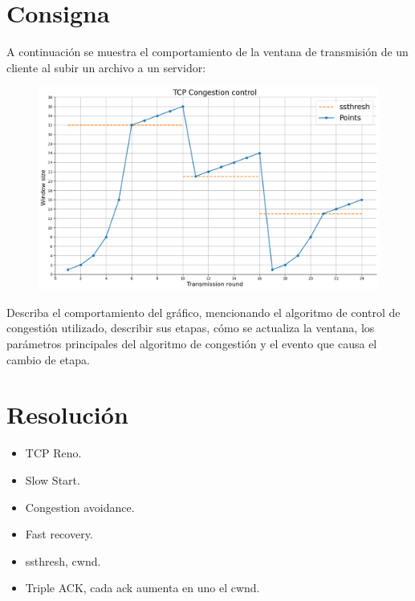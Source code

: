 \section*{Consigna}

A continuación se muestra el comportamiento de la ventana de transmisión de un cliente al subir un archivo a un servidor:

\begin{figure}[H]
    \centering
    \includegraphics[width=0.95\linewidth]{Images/grafico.png}
\end{figure}

Describa el comportamiento del gráfico, mencionando el algoritmo de control de congestión utilizado, describir sus etapas, cómo se actualiza la ventana, los parámetros principales del algoritmo de congestión y el evento que causa el cambio de etapa.

\section*{Resolución}

\begin{itemize}
\item TCP Reno.
\item Slow Start.
\item Congestion avoidance.
\item Fast recovery.
\item ssthresh, cwnd.
\item Triple ACK, cada ack aumenta en uno el cwnd.
\end{itemize}




